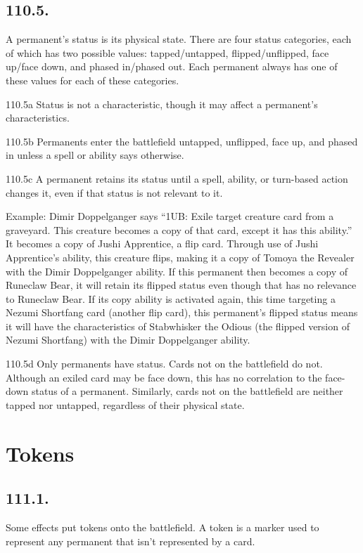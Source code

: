 \subsection*{110.5.}
A permanent’s status is its physical state. There are four status categories, each of which has two possible values: tapped/untapped, flipped/unflipped, face up/face down, and phased in/phased out. Each permanent always has one of these values for each of these categories.

110.5a Status is not a characteristic, though it may affect a permanent’s characteristics.

110.5b Permanents enter the battlefield untapped, unflipped, face up, and phased in unless a spell or ability says otherwise.

110.5c A permanent retains its status until a spell, ability, or turn-based action changes it, even if that status is not relevant to it.

Example: Dimir Doppelganger says “{1}{U}{B}: Exile target creature card from a graveyard. This creature becomes a copy of that card, except it has this ability.” It becomes a copy of Jushi Apprentice, a flip card. Through use of Jushi Apprentice’s ability, this creature flips, making it a copy of Tomoya the Revealer with the Dimir Doppelganger ability. If this permanent then becomes a copy of Runeclaw Bear, it will retain its flipped status even though that has no relevance to Runeclaw Bear. If its copy ability is activated again, this time targeting a Nezumi Shortfang card (another flip card), this permanent’s flipped status means it will have the characteristics of Stabwhisker the Odious (the flipped version of Nezumi Shortfang) with the Dimir Doppelganger ability.

110.5d Only permanents have status. Cards not on the battlefield do not. Although an exiled card may be face down, this has no correlation to the face-down status of a permanent. Similarly, cards not on the battlefield are neither tapped nor untapped, regardless of their physical state.

\section{Tokens}
\subsection*{111.1.}
Some effects put tokens onto the battlefield. A token is a marker used to represent any permanent that isn’t represented by a card.


